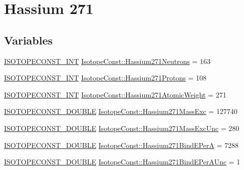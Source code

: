 \hypertarget{group___isotope_const-_hassium-_hs271}{}\section{Hassium 271}
\label{group___isotope_const-_hassium-_hs271}
\subsection*{Variables}
\begin{DoxyCompactItemize}
\item 
\mbox{\hyperlink{group___isotope_const-_macros_ga5f18360b3e99483a35c32d789e62621c}{I\+S\+O\+T\+O\+P\+E\+C\+O\+N\+S\+T\+\_\+\+I\+NT}} \mbox{\hyperlink{group___isotope_const-_hassium-_hs271_gae52269408e7597d9e2d29f69f4dd4ec5}{Isotope\+Const\+::\+Hassium271\+Neutrons}} = 163
\item 
\mbox{\hyperlink{group___isotope_const-_macros_ga5f18360b3e99483a35c32d789e62621c}{I\+S\+O\+T\+O\+P\+E\+C\+O\+N\+S\+T\+\_\+\+I\+NT}} \mbox{\hyperlink{group___isotope_const-_hassium-_hs271_ga0d2a6987d02649536124bb0ae1619a57}{Isotope\+Const\+::\+Hassium271\+Protons}} = 108
\item 
\mbox{\hyperlink{group___isotope_const-_macros_ga5f18360b3e99483a35c32d789e62621c}{I\+S\+O\+T\+O\+P\+E\+C\+O\+N\+S\+T\+\_\+\+I\+NT}} \mbox{\hyperlink{group___isotope_const-_hassium-_hs271_ga94e2ec2953de2cfbff474b047af68b41}{Isotope\+Const\+::\+Hassium271\+Atomic\+Weight}} = 271
\item 
\mbox{\hyperlink{group___isotope_const-_macros_ga8f45a7272ce02c0b4c65c44636ed719a}{I\+S\+O\+T\+O\+P\+E\+C\+O\+N\+S\+T\+\_\+\+D\+O\+U\+B\+LE}} \mbox{\hyperlink{group___isotope_const-_hassium-_hs271_ga602d25e9923b112798c458f95afc0bd1}{Isotope\+Const\+::\+Hassium271\+Mass\+Exc}} = 127740
\item 
\mbox{\hyperlink{group___isotope_const-_macros_ga8f45a7272ce02c0b4c65c44636ed719a}{I\+S\+O\+T\+O\+P\+E\+C\+O\+N\+S\+T\+\_\+\+D\+O\+U\+B\+LE}} \mbox{\hyperlink{group___isotope_const-_hassium-_hs271_gacbcf4114c4854bda443607d35e5d70ea}{Isotope\+Const\+::\+Hassium271\+Mass\+Exc\+Unc}} = 280
\item 
\mbox{\hyperlink{group___isotope_const-_macros_ga8f45a7272ce02c0b4c65c44636ed719a}{I\+S\+O\+T\+O\+P\+E\+C\+O\+N\+S\+T\+\_\+\+D\+O\+U\+B\+LE}} \mbox{\hyperlink{group___isotope_const-_hassium-_hs271_ga08e5b04a4be919d83c47026d771d1768}{Isotope\+Const\+::\+Hassium271\+Bind\+E\+PerA}} = 7288
\item 
\mbox{\hyperlink{group___isotope_const-_macros_ga8f45a7272ce02c0b4c65c44636ed719a}{I\+S\+O\+T\+O\+P\+E\+C\+O\+N\+S\+T\+\_\+\+D\+O\+U\+B\+LE}} \mbox{\hyperlink{group___isotope_const-_hassium-_hs271_gac44901c520aa1aa8d4a28c5f605b34fa}{Isotope\+Const\+::\+Hassium271\+Bind\+E\+Per\+A\+Unc}} = 1

\end{DoxyCompactItemize}

